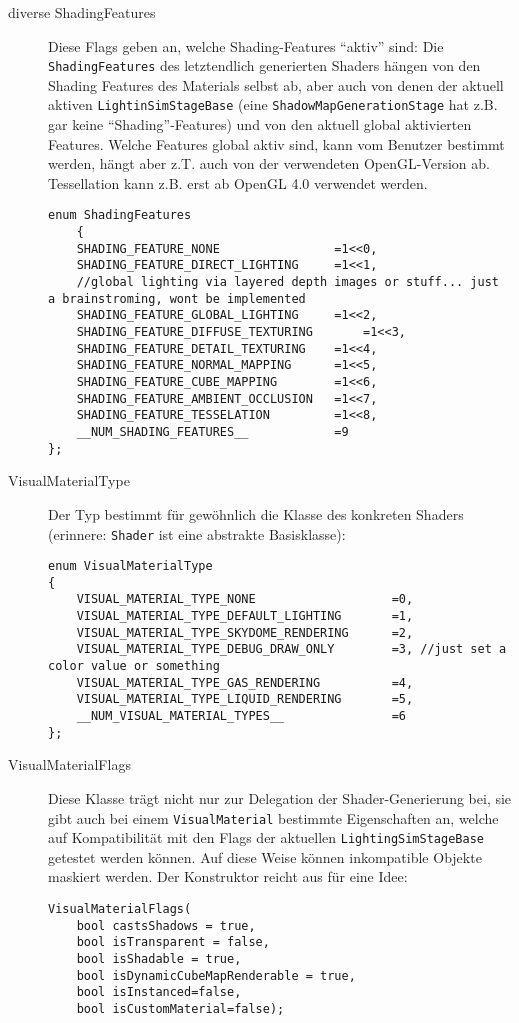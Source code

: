 \begin{description}
		
		
		\item[diverse ShadingFeatures] 
		Diese Flags geben an, welche Shading-Features "`aktiv"' sind: Die \lstinline|ShadingFeatures| des letztendlich
		generierten Shaders hängen von den Shading Features des Materials selbst ab, aber auch von denen der 
		aktuell aktiven \lstinline|LightinSimStageBase| (eine \lstinline|ShadowMapGenerationStage| hat z.B. gar keine
		"`Shading"'-Features) und von den aktuell global aktivierten Features. Welche Features global aktiv sind, kann
		vom Benutzer bestimmt werden, hängt aber z.T. auch von der verwendeten OpenGL-Version ab. Tessellation kann z.B. 
		erst ab OpenGL 4.0 verwendet werden.
		
		\begin{lstlisting}
enum ShadingFeatures
	{
	SHADING_FEATURE_NONE				=1<<0,
	SHADING_FEATURE_DIRECT_LIGHTING		=1<<1,
	//global lighting via layered depth images or stuff... just a brainstroming, wont be implemented
	SHADING_FEATURE_GLOBAL_LIGHTING		=1<<2,
	SHADING_FEATURE_DIFFUSE_TEXTURING		=1<<3,
	SHADING_FEATURE_DETAIL_TEXTURING	=1<<4,
	SHADING_FEATURE_NORMAL_MAPPING		=1<<5,
	SHADING_FEATURE_CUBE_MAPPING		=1<<6,
	SHADING_FEATURE_AMBIENT_OCCLUSION	=1<<7,
	SHADING_FEATURE_TESSELATION			=1<<8,
	__NUM_SHADING_FEATURES__			=9
};
	\end{lstlisting}
		
		
	\item[VisualMaterialType]
	Der Typ bestimmt für gewöhnlich die Klasse des konkreten Shaders (erinnere: \lstinline|Shader| ist eine abstrakte 
	Basisklasse):	
	\begin{lstlisting}
enum VisualMaterialType
{
	VISUAL_MATERIAL_TYPE_NONE					=0,
	VISUAL_MATERIAL_TYPE_DEFAULT_LIGHTING  		=1,
	VISUAL_MATERIAL_TYPE_SKYDOME_RENDERING		=2,
	VISUAL_MATERIAL_TYPE_DEBUG_DRAW_ONLY		=3,	//just set a color value or something
	VISUAL_MATERIAL_TYPE_GAS_RENDERING			=4,
	VISUAL_MATERIAL_TYPE_LIQUID_RENDERING		=5,
	__NUM_VISUAL_MATERIAL_TYPES__				=6
};
	\end{lstlisting}
	
	
	\item[VisualMaterialFlags]
	Diese Klasse trägt nicht nur zur Delegation der Shader-Generierung bei, sie
	gibt auch bei einem \lstinline|VisualMaterial| bestimmte Eigenschaften an,
	welche auf Kompatibilität mit den Flags der aktuellen \lstinline|LightingSimStageBase| getestet werden können.
	Auf diese Weise können inkompatible Objekte maskiert werden.
	Der Konstruktor reicht aus für eine Idee:
	\begin{lstlisting}
VisualMaterialFlags(
	bool castsShadows = true,
	bool isTransparent = false,
	bool isShadable = true,
	bool isDynamicCubeMapRenderable = true,
	bool isInstanced=false,
	bool isCustomMaterial=false);
	\end{lstlisting}
		
	\end{description}
	
